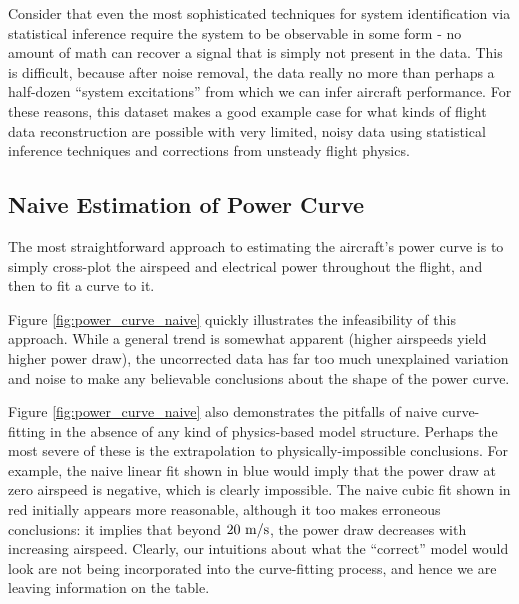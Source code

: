 Consider that even the most sophisticated techniques for system identification via statistical inference require the system to be observable in some form - no amount of math can recover a signal that is simply not present in the data. This is difficult, because after noise removal, the data really no more than perhaps a half-dozen ``system excitations'' from which we can infer aircraft performance. For these reasons, this dataset makes a good example case for what kinds of flight data reconstruction are possible with very limited, noisy data using statistical inference techniques and corrections from unsteady flight physics.

\subsection{Naive Estimation of Power Curve}

The most straightforward approach to estimating the aircraft's power curve is to simply cross-plot the airspeed and electrical power throughout the flight, and then to fit a curve to it.

Figure \ref{fig:power_curve_naive} quickly illustrates the infeasibility of this approach. While a general trend is somewhat apparent (higher airspeeds yield higher power draw), the uncorrected data has far too much unexplained variation and noise to make any believable conclusions about the shape of the power curve.

Figure \ref{fig:power_curve_naive} also demonstrates the pitfalls of naive curve-fitting in the absence of any kind of physics-based model structure. Perhaps the most severe of these is the extrapolation to physically-impossible conclusions. For example, the naive linear fit shown in blue would imply that the power draw at zero airspeed is negative, which is clearly impossible. The naive cubic fit shown in red initially appears more reasonable, although it too makes erroneous conclusions: it implies that beyond $20\ \rm m/s$, the power draw decreases with increasing airspeed. Clearly, our intuitions about what the ``correct'' model would look are not being incorporated into the curve-fitting process, and hence we are leaving information on the table.

